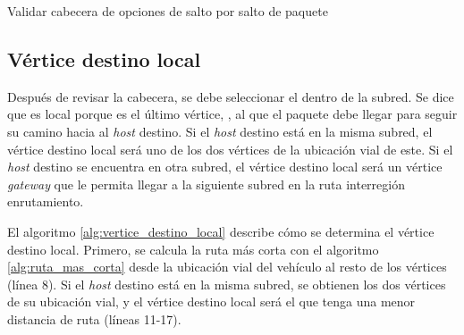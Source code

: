 \begin{algorithm}[th!]
\caption{Validar cabecera de opciones de salto por salto de paquete}
\label{alg:validar_cabeceras_paquete}
\DontPrintSemicolon
\LinesNumbered
\end{algorithm}

\subsection{Vértice destino local}

\label{subsec:vertice_destino_local}

Después de revisar la cabecera, se debe seleccionar el  dentro de la subred. Se dice que es local porque es el último vértice,
, al que el paquete debe llegar para
seguir su camino hacia al \textit{host} destino. Si el \textit{host} destino
está en la misma subred, el vértice destino local será uno de los dos vértices
de la ubicación vial de este. Si el \textit{host} destino se encuentra en otra
subred, el vértice destino local será un vértice \textit{gateway} que le
permita llegar a la siguiente subred en la ruta interregión enrutamiento.

El algoritmo \ref{alg:vertice_destino_local} describe cómo se determina el
vértice destino local. Primero, se calcula la ruta más corta con el algoritmo
\ref{alg:ruta_mas_corta} desde la ubicación vial del vehículo al resto de los
vértices (línea 8). Si el \textit{host} destino está en la misma subred, se
obtienen los dos vértices de su ubicación vial, y el vértice destino local será
el que tenga una menor distancia de ruta (líneas 11-17).

